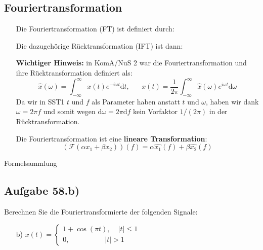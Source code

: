 \documentclass[11pt]{article}
\begin{document}
\vspace*{-0.5cm}
\subsection*{Fouriertransformation}
\vspace*{-0.5cm}
\begin{itemize}[leftmargin=0pt]
    \item[] Die Fouriertransformation (FT) ist definiert durch:
    \item[] %
    \item[] Die dazugehörige Rücktransformation (IFT) ist dann:
    \item[] %
\item[] \textbf{Wichtiger Hinweis:} in KomA/NuS 2 war die Fouriertransformation und ihre Rücktransformation definiert als:
$$\hat{x}(\omega) = \int_{-\infty}^{\infty} x(t) e^{-i\omega t}\text{d}t, \hspace{20pt} x(t)=\frac{1}{2\pi} \int_{-\infty}^{\infty} \hat{x}(\omega)e^{i\omega t} \text{d}\omega$$
Da wir in SST1 $t$ und $f$ als Parameter haben anstatt $t$ und $\omega$, haben wir dank $\omega = 2\pi f $ und somit wegen $\text{d}\omega = 2\pi \text{d}f$ kein Vorfaktor $1/(2\pi)$ in der Rücktransformation.
\item[] Die Fouriertransformation ist eine \textbf{lineare Transformation}:
$$(\mathcal{F}(\alpha x_1 + \beta x_2))(f) = \alpha \hat{x_1}(f) + \beta \hat{x_2}(f) $$
\end{itemize}

\pagebreak

Formelsammlung

\vfill \null
\pagebreak

\subsection*{Aufgabe 58.b)}
\vspace*{-0.5cm}
Berechnen Sie die Fouriertransformierte der folgenden Signale:
\vspace*{-0.5cm}
\begin{itemize}
    \item[b)] $x(t) = \begin{cases}
        1 + \cos(\pi t), \hspace{13pt} |t| \leq 1\\
        0, \hspace{60pt} |t| > 1
    \end{cases}$
\end{itemize}
\end{document}
